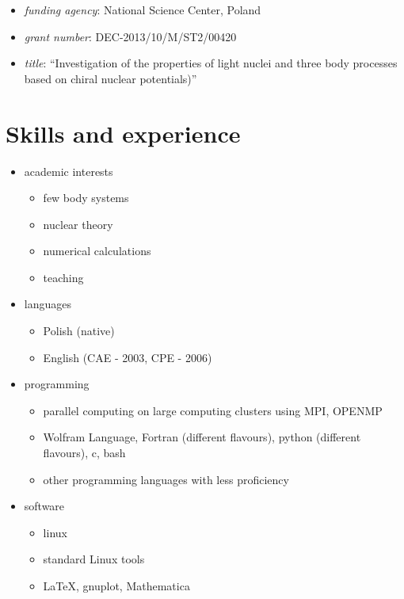 \documentclass{article}
\providecommand{\tightlist}{%
  \setlength{\itemsep}{0pt}\setlength{\parskip}{0pt}}
\begin{document}
\begin{itemize}
\begin{itemize}
    \begin{itemize}
    \tightlist
    \item
      \emph{funding agency}: National Science Center, Poland
    \item
      \emph{grant number}: DEC-2013/10/M/ST2/00420
    \item
      \emph{title}: ``Investigation of the properties of light nuclei
      and three body processes based on chiral nuclear potentials)''
    \end{itemize}
  \end{itemize}
\end{itemize}

\hypertarget{skills-and-experience}{%
\section*{Skills and experience}\label{skills-and-experience}}

\begin{itemize}
\tightlist
\item
  academic interests

  \begin{itemize}
  \tightlist
  \item
    few body systems
  \item
    nuclear theory
  \item
    numerical calculations
  \item
    teaching
  \end{itemize}
\item
  languages

  \begin{itemize}
  \tightlist
  \item
    Polish (native)
  \item
    English (CAE - 2003, CPE - 2006)
  \end{itemize}
\item
  programming

  \begin{itemize}
  \tightlist
  \item
    parallel computing on large computing clusters using MPI, OPENMP
  \item
    Wolfram Language, Fortran (different flavours), python (different
    flavours), c, bash
  \item
    other programming languages with less proficiency
  \end{itemize}
\item
  software

  \begin{itemize}
  \tightlist
  \item
    linux
  \item
    standard Linux tools
  \item
    LaTeX, gnuplot, Mathematica
  \end{itemize}
\end{itemize}
\end{document}

